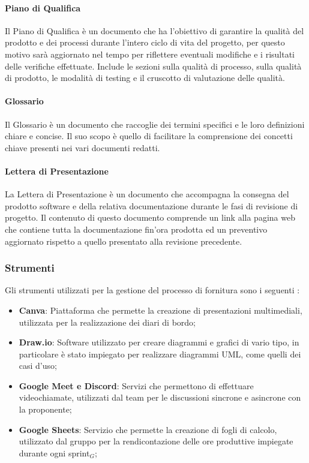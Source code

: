 \documentclass[10pt]{article}
\begin{document}
\begin{justify}
        \paragraph{Piano di Qualifica}
        Il Piano di Qualifica è un documento che ha l'obiettivo di garantire la qualità del prodotto e dei processi durante l'intero ciclo di vita del progetto, per questo motivo sarà aggiornato nel tempo per riflettere eventuali modifiche e i risultati delle verifiche effettuate. Include le sezioni sulla qualità di processo, sulla qualità di prodotto, le modalità di testing e il cruscotto di valutazione delle qualità.\\

        \paragraph{Glossario}
        Il Glossario è un documento che raccoglie dei termini specifici e le loro definizioni chiare e concise. Il suo scopo è quello di facilitare la comprensione dei concetti chiave presenti nei vari documenti redatti.\\

        \paragraph{Lettera di Presentazione}
        La Lettera di Presentazione è un documento che accompagna la consegna del prodotto software e della relativa documentazione durante le fasi di revisione di progetto. Il contenuto di questo documento comprende un link alla pagina web che contiene tutta la documentazione fin'ora prodotta ed un preventivo aggiornato rispetto a quello presentato alla revisione precedente.\\

    \subsubsection{Strumenti}
    Gli strumenti utilizzati per la gestione del processo di fornitura sono i seguenti :
    \begin{itemize}
        \item \textbf{Canva}: Piattaforma che permette la creazione di presentazioni multimediali, utilizzata per la realizzazione dei diari di bordo;
        \item \textbf{Draw.io}: Software utilizzato per creare diagrammi e grafici di vario tipo, in particolare è stato impiegato per realizzare diagrammi UML, come quelli dei casi d’uso;
        \item \textbf{Google Meet e Discord}: Servizi che permettono di effettuare videochiamate, utilizzati dal team per le discussioni sincrone e asincrone con la proponente;
        \item \textbf{Google Sheets}: Servizio che permette la creazione di fogli di calcolo, utilizzato dal gruppo per la rendicontazione delle ore produttive impiegate durante ogni sprint$_G$;
    \end{itemize}


\end{justify}
\end{document}
